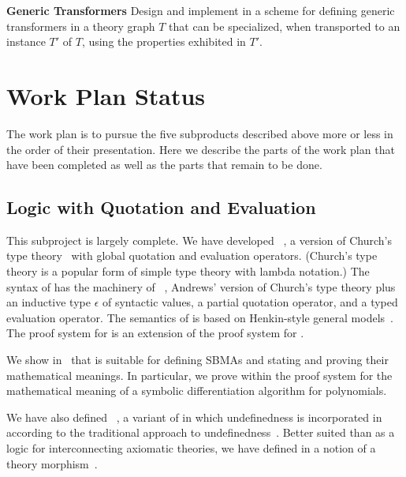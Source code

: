 \documentclass[fleqn]{llncs}
\begin{document}
\medskip

  \item[]\textbf{Generic Transformers} Design and implement in  a
    scheme for defining generic transformers in a theory graph $T$
    that can be specialized, when transported to an instance $T'$ of
    $T$, using the properties exhibited in $T'$.

\ei


\section{Work Plan Status}

The work plan is to pursue the five subproducts described above more or less in
the order of their presentation.  Here we describe the parts of the work
plan that have been completed as well as the parts that remain to be done.

\subsection*{Logic with Quotation and Evaluation}

This subproject is largely complete.  We have developed
{\churchqe}~\cite{Farmer18}, a version of Church's type
theory~\cite{Church40} with global quotation and evaluation operators.
(Church's type theory is a popular form of simple type theory with
lambda notation.)  The syntax of {\churchqe} has the machinery of
{\qzero}~\cite{Andrews02}, Andrews' version of Church's type theory
plus an inductive type $\epsilon$ of syntactic values, a partial
quotation operator, and a typed evaluation operator.  The semantics of
{\churchqe} is based on Henkin-style general models~\cite{Henkin50}.
The proof system for {\churchqe} is an extension of the proof system
for {\qzero}.

We show in~\cite{Farmer18} that {\churchqe} is suitable for defining
SBMAs and stating and proving their mathematical meanings.  In
particular, we prove within the proof system for {\churchqe} the
mathematical meaning of a symbolic differentiation algorithm for
polynomials.

We have also defined {\churchuqe}~\cite{Farmer17}, a variant of
{\churchqe} in which undefinedness is incorporated in {\churchqe}
according to the traditional approach to
undefinedness~\cite{Farmer04}.  Better suited than {\churchqe} as a
logic for interconnecting axiomatic theories, we have defined in
{\churchuqe} a notion of a theory morphism~\cite{Farmer17}.
\end{document}
